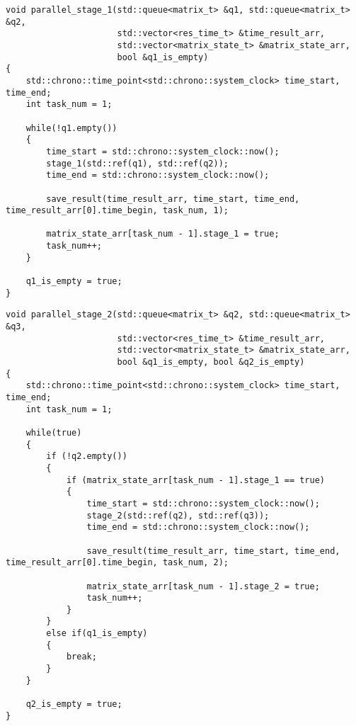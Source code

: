 \begin{center}
\captionsetup{justification=raggedright,singlelinecheck=off}
\begin{lstlisting}[label=lst:parallel_stage_1,caption=Функция 1-ой ленты конвейерной обработки матрицы]
void parallel_stage_1(std::queue<matrix_t> &q1, std::queue<matrix_t> &q2,
                      std::vector<res_time_t> &time_result_arr,
                      std::vector<matrix_state_t> &matrix_state_arr, 
                      bool &q1_is_empty)
{
    std::chrono::time_point<std::chrono::system_clock> time_start, time_end;
    int task_num = 1;

    while(!q1.empty())
    {   
        time_start = std::chrono::system_clock::now();
        stage_1(std::ref(q1), std::ref(q2));
        time_end = std::chrono::system_clock::now();

        save_result(time_result_arr, time_start, time_end, time_result_arr[0].time_begin, task_num, 1);

        matrix_state_arr[task_num - 1].stage_1 = true;
        task_num++;
    }

    q1_is_empty = true;
}
\end{lstlisting}
\end{center}

\clearpage

\begin{center}
\captionsetup{justification=raggedright,singlelinecheck=off}
\begin{lstlisting}[label=lst:parallel_stage_2,caption=Функция 2-ой ленты конвейерной обработки матрицы]
void parallel_stage_2(std::queue<matrix_t> &q2, std::queue<matrix_t> &q3,
                      std::vector<res_time_t> &time_result_arr,
                      std::vector<matrix_state_t> &matrix_state_arr, 
                      bool &q1_is_empty, bool &q2_is_empty)
{
    std::chrono::time_point<std::chrono::system_clock> time_start, time_end;
    int task_num = 1;

    while(true)
    {      
        if (!q2.empty())
        {   
            if (matrix_state_arr[task_num - 1].stage_1 == true)
            {
                time_start = std::chrono::system_clock::now();
                stage_2(std::ref(q2), std::ref(q3));
                time_end = std::chrono::system_clock::now();

                save_result(time_result_arr, time_start, time_end, time_result_arr[0].time_begin, task_num, 2);

                matrix_state_arr[task_num - 1].stage_2 = true;
                task_num++;
            }
        }
        else if(q1_is_empty)
        {
            break;
        }
    }

    q2_is_empty = true;
}
\end{lstlisting}
\end{center}

